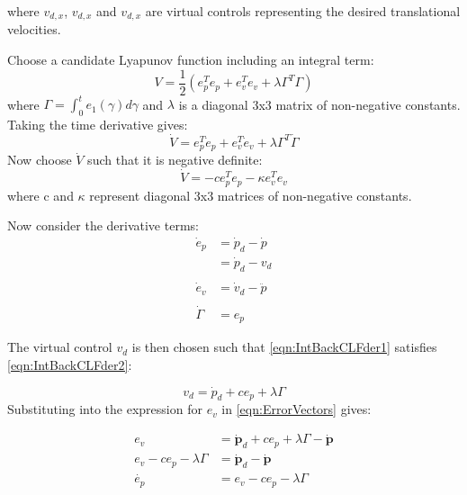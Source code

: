 where $v_{d,x}$, $v_{d,x}$ and $v_{d,x}$ are virtual controls representing the desired translational velocities.

Choose a candidate Lyapunov function including an integral term:
\begin{equation}
V=\frac{1}{2}\left(e_{p}^{T}e_{p}+e_{v}^{T}e_{v}+\lambda\Gamma^{T}\Gamma\right)
\end{equation}
where $\Gamma=\int^{t}_{0} e_{1}(\gamma) d\gamma$ and $\lambda$ is a diagonal 3x3 matrix of non-negative constants.
Taking the time derivative gives:
\begin{equation}\label{eqn:IntBackCLFder1}
\dot{V}=e_{p}^{T}\dot{e}_{p}+e_{v}^{T}\dot{e}_{v}+\lambda\Gamma^{T}\dot{\Gamma}
\end{equation}
Now choose $\dot{V}$ such that it is negative definite:
\begin{equation}\label{eqn:IntBackCLFder2}
\dot{V}=-ce_{p}^{T}e_{p}-\kappa e_{v}^{T}e_{v}
\end{equation}
where c and $\kappa$ represent diagonal 3x3 matrices of non-negative constants.

Now consider the derivative terms:
\begin{equation}\label{eqn:IntBackErrDer}
\begin{split}
\dot{e}_{p}&=\dot{p}_{d}-\dot{p}\\
&=\dot{p}_{d}-v_{d}\\\\
\dot{e}_{v}&=\dot{v}_{d}-\ddot{p}\\\\
\dot{\Gamma}&=e_{p}
\end{split}
\end{equation}

The virtual control $v_{d}$ is then chosen such that \eqref{eqn:IntBackCLFder1} satisfies \eqref{eqn:IntBackCLFder2}:

\begin{equation*}
v_{d}= \dot{p}_{d}+ce_{p}+\lambda\Gamma
\end{equation*}
Substituting into the expression for $e_{v}$ in \eqref{eqn:ErrorVectors} gives:

\begin{equation}\label{eqn:e_p1}
\begin{split}
e_{v}&=\mathbf{\dot{p}}_{d}+ce_{p}+\lambda\Gamma - \mathbf{\dot{p}}\\
e_{v}-ce_{p}-\lambda\Gamma&=\mathbf{\dot{p}}_{d}- \mathbf{\dot{p}}\\
\dot{e_{p}}&=e_{v}-ce_{p}-\lambda\Gamma
\end{split}
\end{equation}
 

